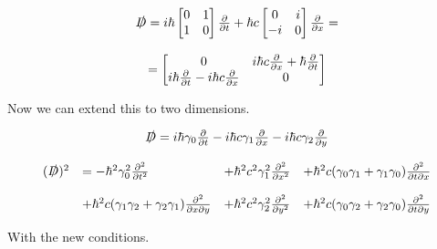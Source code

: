 \begin{equation}
  \begin{array}{c}
    \slashed{D} = i\hbar\begin{bmatrix}
      0 & 1\\
      1 & 0\end{bmatrix} \frac{\partial}{\partial t} + \hbar c \begin{bmatrix}
      0 & i\\
      -i & 0\end{bmatrix} \frac{\partial}{\partial x} =
      \\

      \\
      = \begin{bmatrix}
      0 & i\hbar c \frac{\partial}{\partial x} + \hbar \frac{\partial}{\partial t}\\
      i\hbar \frac{\partial}{\partial t} - i\hbar c \frac{\partial}{\partial x} & 0\end{bmatrix}
  \end{array}
\end{equation}

Now we can extend this to two dimensions.

\begin{equation}
  \begin{array}{c}
  \slashed{D} = i\hbar\gamma_0 \frac{\partial}{\partial t} - i\hbar c \gamma_1 \frac{\partial}{\partial x} - i\hbar c\gamma_2 \frac{\partial}{\partial y}
  \\

  \\
  \begin{array}{llll}
    (\slashed{D})^2 &= -\hbar^2 \gamma_0^2 \frac{\partial^2}{\partial t^2} &+ \hbar^2 c^2 \gamma_1^2 \frac{\partial^2}{\partial x^2} &+ \hbar^2 c (\gamma_0\gamma_1 + \gamma_1\gamma_0)\frac{\partial^2}{\partial t \partial x}
    \\

    \\
                    &+ \hbar^2 c (\gamma_1\gamma_2 + \gamma_2\gamma_1)\frac{\partial^2}{\partial x \partial y}  &+\hbar^2 c^2 \gamma_2^2 \frac{\partial^2}{\partial y^2}  &+ \hbar^2 c (\gamma_0\gamma_2 + \gamma_2\gamma_0)\frac{\partial^2}{\partial t \partial y}
  \end{array}
\end{array}
\end{equation}

With the new conditions.


